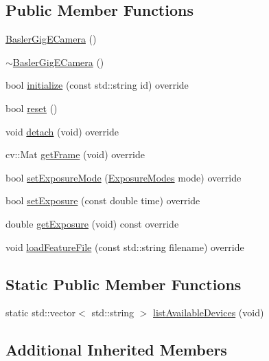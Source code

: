 \subsection*{Public Member Functions}
\begin{DoxyCompactItemize}
\item 
\hyperlink{classBaslerGigECamera_a4e73954bf129084f8ad3aae41eb07ed5}{Basler\+Gig\+E\+Camera} ()
\item 
\hyperlink{classBaslerGigECamera_a0dbeed22c6adda8a9a9e7172a1a3f7ea}{$\sim$\+Basler\+Gig\+E\+Camera} ()
\item 
bool \hyperlink{classBaslerGigECamera_a1690e409075c423eec92a039781989df}{initialize} (const std\+::string id) override
\item 
bool \hyperlink{classBaslerGigECamera_ad1f9154be71d1dba2e456fc404198774}{reset} ()
\item 
void \hyperlink{classBaslerGigECamera_a13a51a76116cccbd537725457d83254f}{detach} (void) override
\item 
cv\+::\+Mat \hyperlink{classBaslerGigECamera_a8e2789aa27a9b0a8075457223afa415e}{get\+Frame} (void) override
\item 
bool \hyperlink{classBaslerGigECamera_a228061fb068600be59b4e83c0e8a8e50}{set\+Exposure\+Mode} (\hyperlink{constants_8h_a6e920987695b1da6e2df4e41dc867e18}{Exposure\+Modes} mode) override
\item 
bool \hyperlink{classBaslerGigECamera_a99f9cd699aac5cb1025cb7086fbba7c0}{set\+Exposure} (const double time) override
\item 
double \hyperlink{classBaslerGigECamera_a5f7897cae5155958ecaa8b2b9196e4e6}{get\+Exposure} (void) const override
\item 
void \hyperlink{classBaslerGigECamera_aa7e8cde9ecc7b2375146f41a6e35840e}{load\+Feature\+File} (const std\+::string filename) override
\end{DoxyCompactItemize}
\subsection*{Static Public Member Functions}
\begin{DoxyCompactItemize}
\item 
static std\+::vector$<$ std\+::string $>$ \hyperlink{classBaslerGigECamera_ad5460ff8176dd5ad111d5b9d11753ab0}{list\+Available\+Devices} (void)
\end{DoxyCompactItemize}
\subsection*{Additional Inherited Members}


